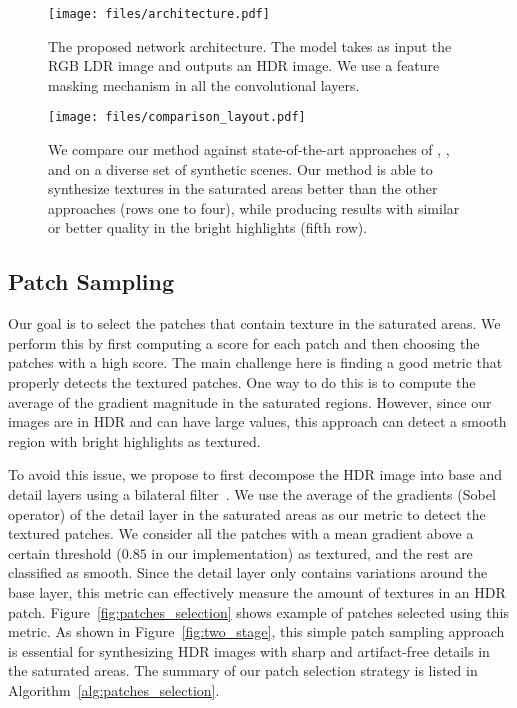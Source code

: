 \begin{figure}
\centering
\vspace{-0.20in}
\texttt{[image: files/architecture.pdf]}
\vspace{-0.30in}
\caption{The proposed network architecture. The model takes as input the RGB LDR image and outputs an HDR image. We use a feature masking mechanism in all the convolutional layers. }
\vspace{-0.3in}
\label{fig:architecture}
\end{figure}

\begin{figure*}
  \texttt{[image: files/comparison\_layout.pdf]}
  \vspace{-0.30in}
  \caption{We compare our method against state-of-the-art approaches of \citet{endo2017deep}, \citet{eilertsen2017hdr}, and \citet{marnerides2018expandnet} on a diverse set of synthetic scenes. Our method is able to synthesize textures in the saturated areas better than the other approaches (rows one to four), while producing results with similar or better quality in the bright highlights (fifth row).}
  \vspace{-0.20in}
  \label{fig:comparison}
\end{figure*}

\subsection{Patch Sampling}
\label{sec:patch_sampling}

Our goal is to select the patches that contain texture in the saturated areas. We perform this by first computing a score for each patch and then choosing the patches with a high score. The main challenge here is finding a good metric that properly detects the textured patches. One way to do this is to compute the average of the gradient magnitude in the saturated regions. However, since our images are in HDR and can have large values, this approach can detect a smooth region with bright highlights as textured.

To avoid this issue, we propose to first decompose the HDR image into base and detail layers using a bilateral filter~\cite{durand2002fast}. We use the average of the gradients (Sobel operator) of the detail layer in the saturated areas as our metric to detect the textured patches. We consider all the patches with a mean gradient above a certain threshold ($0.85$ in our implementation) as textured, and the rest are classified as smooth. Since the detail layer only contains variations around the base layer, this metric can effectively measure the amount of textures in an HDR patch. Figure~\ref{fig:patches_selection} shows example of patches selected using this metric. As shown in Figure~\ref{fig:two_stage}, this simple patch sampling approach is essential for synthesizing HDR images with sharp and artifact-free details in the saturated areas. The summary of our patch selection strategy is listed in Algorithm~\ref{alg:patches_selection}.




